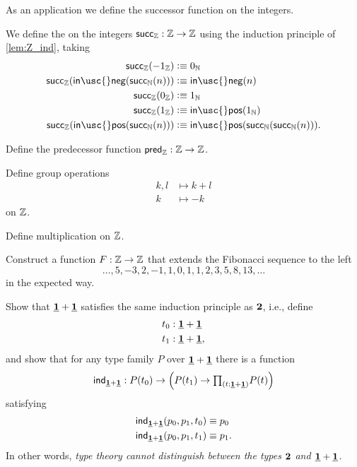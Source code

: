 As an application we define the successor function on the integers.

\begin{defn}
We define the  on the integers $\mathsf{succ}_{\mathbb{Z}}:{\mathbb{Z}}\to{\mathbb{Z}}$ using the induction principle of \cref{lem:Z_ind}, taking
\begin{align*}
\mathsf{succ}_\Z(-1_\Z) & \defeq 0_\N \\
\mathsf{succ}_\Z(\mathsf{in\usc{}neg}(\mathsf{succ}_\N(n))) & \defeq \mathsf{in\usc{}neg}(n) \\
\mathsf{succ}_\Z(0_\Z) & \defeq 1_\N \\
\mathsf{succ}_\Z(1_\Z) & \defeq \mathsf{in\usc{}pos}(1_\N) \\
\mathsf{succ}_\Z(\mathsf{in\usc{}pos}(\mathsf{succ}_\N(n))) & \defeq \mathsf{in\usc{}pos}(\mathsf{succ}_\N(\mathsf{succ}_\N(n))).
\end{align*}
\end{defn}

\begin{exercises}
\item \label{ex:int_pred}Define the predecessor function $\mathsf{pred}_{\mathbb{Z}}:{\mathbb{Z}}\to {\mathbb{Z}}$.
\item \label{ex:int_group_ops}Define group operations
  \begin{align*}
    k,l & \mapsto k+l \\
    k & \mapsto -k
  \end{align*}
  on ${\mathbb{Z}}$.
\item Define multiplication on ${\mathbb{Z}}$.
\item Construct a function $F:{\mathbb{Z}}\to{\mathbb{Z}}$ that extends the Fibonacci sequence to the left
  \begin{equation*}
    \ldots,5,-3,2,-1,1,0,1,1,2,3,5,8,13,\ldots
  \end{equation*}
  in the expected way.
\item \label{ex:one_plus_one} Show that $\underline{\mathbf{1}}+\underline{\mathbf{1}}$ satisfies the same induction principle as $\mathbf{2}$, i.e., define
  \begin{align*}
    t_0 & : \underline{\mathbf{1}} + \underline{\mathbf{1}} \\
    t_1 & : \underline{\mathbf{1}} + \underline{\mathbf{1}},
  \end{align*}
  and show that for any type family $P$ over $\underline{\mathbf{1}}+\underline{\mathbf{1}}$ there is a function
  \begin{align*}
    \ind{\unit+\unit}:P(t_0)\to \Big(P(t_1)\to \prd{t:\unit+\unit}P(t)\Big)
  \end{align*}
  satisfying
  \begin{align*}
    \mathsf{ind}_{\underline{\mathbf{1}}+\underline{\mathbf{1}}}(p_0,p_1,t_0) & \equiv p_0 \\
    \mathsf{ind}_{\underline{\mathbf{1}}+\underline{\mathbf{1}}}(p_0,p_1,t_1) & \equiv p_1.
  \end{align*}
  In other words, \emph{type theory cannot distinguish between the types $\mathbf{2}$ and $\underline{\mathbf{1}}+\underline{\mathbf{1}}$.}
\end{exercises}
